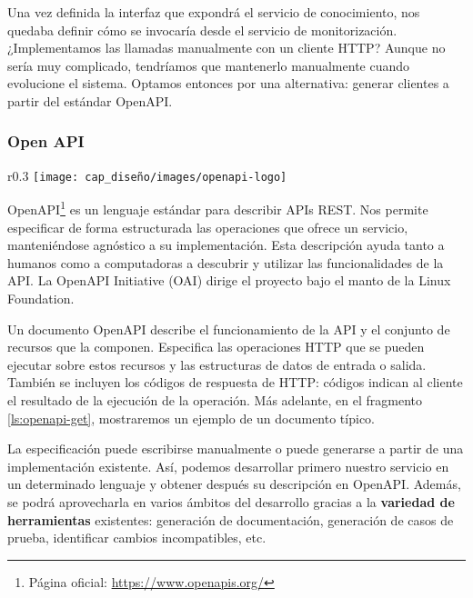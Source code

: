 Una vez definida la interfaz que expondrá el servicio de conocimiento, nos quedaba definir cómo se invocaría desde el servicio de monitorización. ¿Implementamos las llamadas manualmente con un cliente HTTP? Aunque no sería muy complicado, tendríamos que mantenerlo manualmente cuando evolucione el sistema. Optamos entonces por una alternativa: generar clientes a partir del estándar OpenAPI.

\subsubsection{Open API}
\label{chap:OpenAPI}

\begin{wrapfigure}{r}{0.3\linewidth}
  \vspace{5pt}
  \texttt{[image: cap\_diseño/images/openapi-logo]}
  \centering
  \vspace{5pt}
\end{wrapfigure}

OpenAPI\footnote{Página oficial: \url{https://www.openapis.org/}} es un lenguaje estándar para describir APIs REST. Nos permite especificar de forma estructurada las operaciones que ofrece un servicio, manteniéndose agnóstico a su implementación. Esta descripción ayuda tanto a humanos como a computadoras a descubrir y utilizar las funcionalidades de la API.\cite{openapi_initiativeOpenAPISpecificationV3} La OpenAPI Initiative (OAI) dirige el proyecto bajo el manto de la Linux Foundation.

Un documento OpenAPI describe el funcionamiento de la API y el conjunto de recursos que la componen. Especifica las operaciones HTTP que se pueden ejecutar sobre estos recursos y las estructuras de datos de entrada o salida. También se incluyen los códigos de respuesta de HTTP: códigos indican al cliente el resultado de la ejecución de la operación. \cite{openapi_initiativeOpenAPISpecificationV3} Más adelante, en el fragmento \ref{ls:openapi-get}, mostraremos un ejemplo de un documento típico.

La especificación puede escribirse manualmente o puede generarse a partir de una implementación existente. Así, podemos desarrollar primero nuestro servicio en un determinado lenguaje y obtener después su descripción en OpenAPI. Además, se podrá aprovecharla en varios ámbitos del desarrollo gracias a la  \textbf{variedad de herramientas} existentes: generación de documentación, generación de casos de prueba, identificar cambios incompatibles, etc. \cite{westerveldChapterOpenAPIAPI2021}

